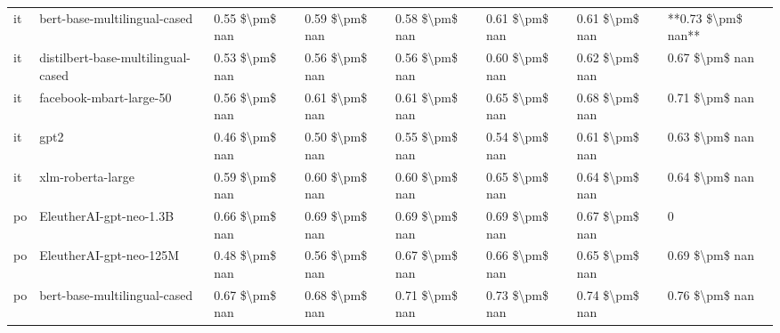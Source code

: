 \begin{tabular}{llllllll}
      it &       bert-base-multilingual-cased & 0.55 \$\textbackslash pm\$ nan &            0.59 \$\textbackslash pm\$ nan &        0.58 \$\textbackslash pm\$ nan &         0.61 \$\textbackslash pm\$ nan &                          0.61 \$\textbackslash pm\$ nan & **0.73 \$\textbackslash pm\$ nan** \\
      it & distilbert-base-multilingual-cased & 0.53 \$\textbackslash pm\$ nan &            0.56 \$\textbackslash pm\$ nan &        0.56 \$\textbackslash pm\$ nan &         0.60 \$\textbackslash pm\$ nan &                          0.62 \$\textbackslash pm\$ nan &     0.67 \$\textbackslash pm\$ nan \\
      it &            facebook-mbart-large-50 & 0.56 \$\textbackslash pm\$ nan &            0.61 \$\textbackslash pm\$ nan &        0.61 \$\textbackslash pm\$ nan &         0.65 \$\textbackslash pm\$ nan &                          0.68 \$\textbackslash pm\$ nan &     0.71 \$\textbackslash pm\$ nan \\
      it &                               gpt2 & 0.46 \$\textbackslash pm\$ nan &            0.50 \$\textbackslash pm\$ nan &        0.55 \$\textbackslash pm\$ nan &         0.54 \$\textbackslash pm\$ nan &                          0.61 \$\textbackslash pm\$ nan &     0.63 \$\textbackslash pm\$ nan \\
      it &                  xlm-roberta-large & 0.59 \$\textbackslash pm\$ nan &            0.60 \$\textbackslash pm\$ nan &        0.60 \$\textbackslash pm\$ nan &         0.65 \$\textbackslash pm\$ nan &                          0.64 \$\textbackslash pm\$ nan &     0.64 \$\textbackslash pm\$ nan \\
      po &            EleutherAI-gpt-neo-1.3B & 0.66 \$\textbackslash pm\$ nan &            0.69 \$\textbackslash pm\$ nan &        0.69 \$\textbackslash pm\$ nan &         0.69 \$\textbackslash pm\$ nan &                          0.67 \$\textbackslash pm\$ nan &                  0 \\
      po &            EleutherAI-gpt-neo-125M & 0.48 \$\textbackslash pm\$ nan &            0.56 \$\textbackslash pm\$ nan &        0.67 \$\textbackslash pm\$ nan &         0.66 \$\textbackslash pm\$ nan &                          0.65 \$\textbackslash pm\$ nan &     0.69 \$\textbackslash pm\$ nan \\
      po &       bert-base-multilingual-cased & 0.67 \$\textbackslash pm\$ nan &            0.68 \$\textbackslash pm\$ nan &        0.71 \$\textbackslash pm\$ nan &         0.73 \$\textbackslash pm\$ nan &                          0.74 \$\textbackslash pm\$ nan &     0.76 \$\textbackslash pm\$ nan \\

\end{tabular}
